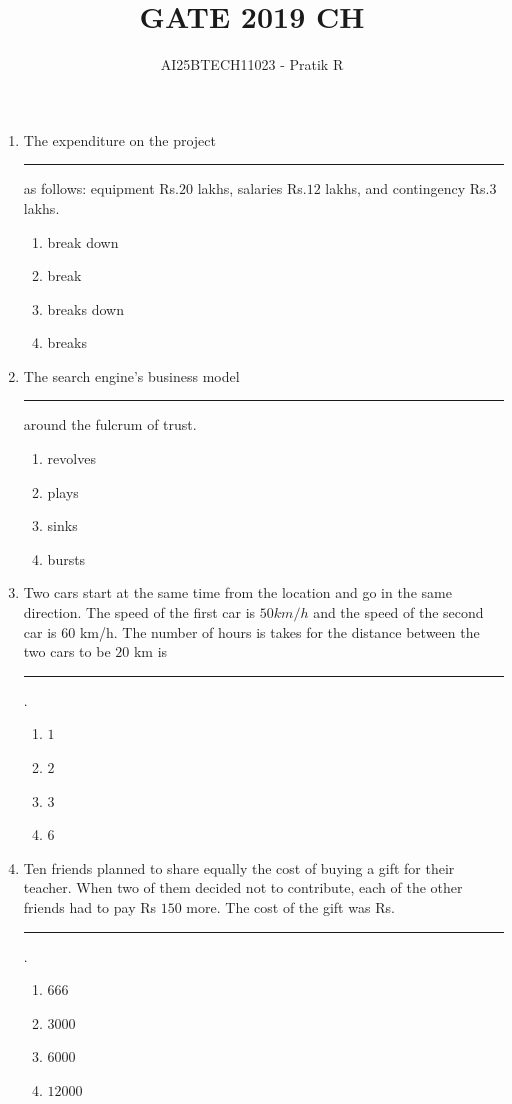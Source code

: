 \documentclass[journal,12pt,onecolumn]{IEEEtran}
\title{GATE 2019 CH}
\author{AI25BTECH11023 - Pratik R}
\theoremstyle{remark}
\begin{document}

\onecolumn

\maketitle

\begin{enumerate}
    \item The expenditure on the project \rule{1cm}{0.1mm} as follows: equipment Rs.$20$ lakhs, salaries Rs.$12$ lakhs, and contingency Rs.$3$ lakhs.
\begin{multicols}{4}
    \begin{enumerate}
        \item break down
        \item break
        \item breaks down
        \item breaks
    \end{enumerate}
\end{multicols}

    \item The search engine's business model \rule{1.5cm}{0.1mm} around the fulcrum of trust.
\begin{multicols}{4}
    \begin{enumerate}
        \item revolves
        \item plays
        \item sinks
        \item bursts
    \end{enumerate}
\end{multicols}

    \item Two cars start at the same time from the location and go in the same direction. The speed of the first car is $50km/h$ and the speed of the second car is $60$ km/h. The number of hours is takes for the distance between the two cars to be $20$ km is \rule{1cm}{0.1mm}.
\begin{multicols}{4}
    \begin{enumerate}
        \item $1$
        \item $2$
        \item $3$
        \item $6$
    \end{enumerate}
\end{multicols}

    \item Ten friends planned to share equally the cost of buying a gift for their teacher. When two of them decided not to contribute, each of the other friends had to pay Rs $150$ more. The cost of the gift was Rs. \rule{1cm}{0.1mm}.
\begin{multicols}{4}
    \begin{enumerate}
        \item $666$
        \item $3000$
        \item $6000$
        \item $12000$
    \end{enumerate}
\end{multicols}


\end{enumerate}
\end{document}
